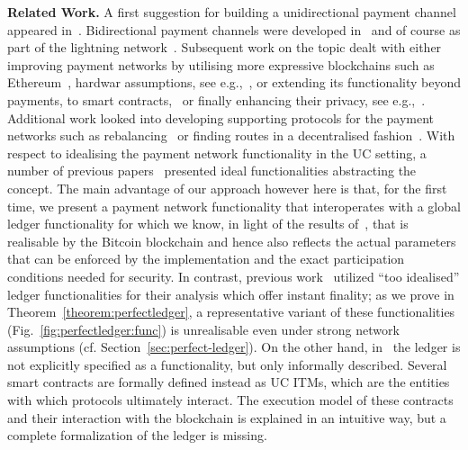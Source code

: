 \noindent \textbf{Related Work.} A first suggestion for building a
unidirectional payment channel appeared in~\cite{spilman}. Bidirectional payment
channels were developed in~\cite{DBLP:conf/sss/DeckerW15} and of course as part
of the lightning network~\cite{lightning}. Subsequent work on the topic dealt
with either improving payment networks by utilising more expressive blockchains
such as Ethereum~\cite{perun}, hardwar assumptions, see
e.g.,~\cite{DBLP:conf/systor/LindNEKPS18}, or extending its functionality beyond
payments, to smart contracts,~\cite{sprites} or finally enhancing their privacy,
see
e.g.,~\cite{Malavolta:2017:CPP:3133956.3134096,DBLP:conf/ccs/0001M17,DBLP:conf/ndss/HeilmanABSG17}.
Additional work looked into developing supporting protocols for the payment
networks such as rebalancing~\cite{DBLP:conf/ccs/KhalilG17} or finding routes in
a decentralised fashion~\cite{flare,spider}. With respect to idealising the
payment network functionality in the UC setting, a number of previous
papers~\cite{DBLP:conf/ccs/DziembowskiFH18,Malavolta:2017:CPP:3133956.3134096,sprites,perun}
presented ideal functionalities abstracting the concept. The main advantage of our
approach however here is that, for the first time, we present a payment network
functionality that interoperates with a global ledger functionality for which we
know, in light of the results of~\cite{BMTZ17}, that is realisable by the
Bitcoin blockchain and hence also reflects the actual parameters that can be
enforced by the implementation and the exact participation conditions needed for
security. In contrast, previous
work~\cite{DBLP:conf/ccs/DziembowskiFH18,Malavolta:2017:CPP:3133956.3134096,perun}
utilized ``too idealised'' ledger functionalities for their analysis which offer
instant finality; as we prove in Theorem~\ref{theorem:perfectledger}, a
representative variant of these functionalities
(Fig.~\ref{fig:perfectledger:func}) is unrealisable even under strong network
assumptions (cf. Section~\ref{sec:perfect-ledger}).  On the other hand, in~\cite{sprites} the ledger is
not explicitly specified as a functionality, but only informally described.
Several smart contracts are formally defined instead as UC ITMs, which are the
entities with which protocols ultimately interact. The execution model of these
contracts and their interaction with the blockchain is explained in an intuitive
way, but a complete formalization of the ledger is missing. 

